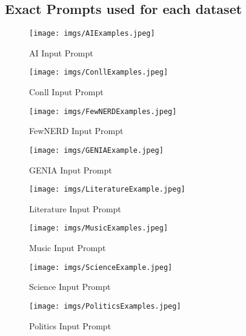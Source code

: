 \documentclass[11pt]{article}
\begin{document}
\subsection{Exact Prompts used for each dataset}

\begin{figure*}[th]
    \centering \texttt{[image: imgs/AIExamples.jpeg]}
    \caption{AI Input Prompt}    \label{fig:input_prompts}
\end{figure*}

\begin{figure*}
    \centering \texttt{[image: imgs/ConllExamples.jpeg]}
    \caption{Conll Input Prompt}
\end{figure*}

\begin{figure*}
    \centering \texttt{[image: imgs/FewNERDExamples.jpeg]}
    \caption{FewNERD Input Prompt}
\end{figure*}

\begin{figure*}
    \centering \texttt{[image: imgs/GENIAExample.jpeg]}
    \caption{GENIA Input Prompt}
\end{figure*}

\begin{figure*}
    \centering \texttt{[image: imgs/LiteratureExample.jpeg]}
    \caption{Literature Input Prompt}
\end{figure*}

\begin{figure*}
    \centering \texttt{[image: imgs/MusicExamples.jpeg]}
    \caption{Music Input Prompt}
\end{figure*}

\begin{figure*}
    \centering \texttt{[image: imgs/ScienceExample.jpeg]}
    \caption{Science Input Prompt}
\end{figure*}

\begin{figure*}
    \centering \texttt{[image: imgs/PoliticsExamples.jpeg]}
    \caption{Politics Input Prompt}
\end{figure*}
 
\end{document}
